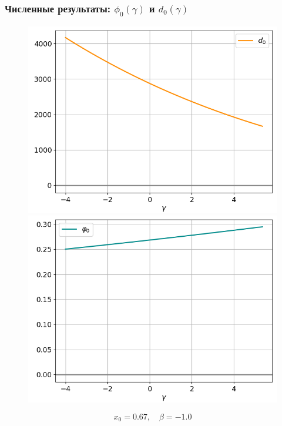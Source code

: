 \documentclass[fullscreen=true, unicode, bookmarks=false]{beamer}
\begin{document}
\begin{frame}
\frametitle{ Численные результаты: $ \phi_0(\gamma) $ и $ d_0(\gamma) $ }

\begin{figure} 
\begin{minipage}[h]{0.49\linewidth}
\begin{center}
\includegraphics[scale=0.35]{oscillating_d0_x0=0,67,beta=-1,0.png}
\end{center}
\end{minipage} 
\hfill
\begin{minipage}[h]{0.49\linewidth}
\begin{center}
\includegraphics[scale=0.35]{oscillating_phi0_x0=0,67,beta=-1,0.png}
\end{center}
\end{minipage} 
\end{figure}

$$ x_0 = 0.67, \quad \beta=-1.0 $$

\end{frame}
\end{document}
